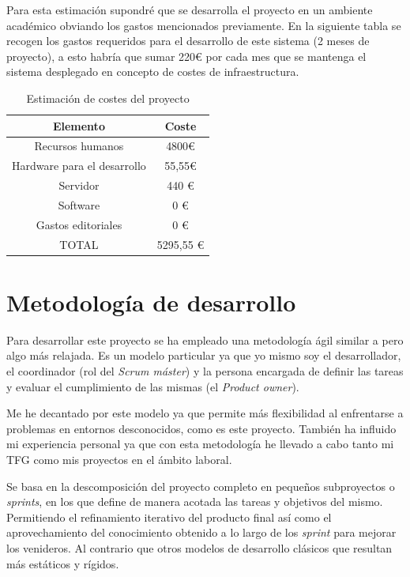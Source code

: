 Para esta estimación supondré que se desarrolla el proyecto en un ambiente académico obviando los gastos mencionados previamente. En la siguiente tabla se recogen los gastos requeridos para el desarrollo de este sistema (2 meses de proyecto), a esto habría que sumar 220€ por cada mes que se mantenga el sistema desplegado en concepto de costes de infraestructura.

\begin{table} [h!]
	\centering
	\begin{tabular}{| c | c |}
		\hline
		\textbf{Elemento}           & \textbf{Coste} \\ \hline
		Recursos humanos            & 4800€          \\
		Hardware para el desarrollo & 55,55€         \\
		Servidor                    & 440 €          \\
		Software                    & 0 €            \\
		Gastos editoriales          & 0 €            \\ \hline
		TOTAL                       & 5295,55 €      \\ \hline
	\end{tabular}
	\caption{Estimación de costes del proyecto}
\end{table}

\newpage

\section{Metodología de desarrollo}
\label{sc:metodologia}
Para desarrollar este proyecto se ha empleado una metodología ágil similar a \textit{}  pero algo más relajada. Es un modelo particular ya que yo mismo soy el desarrollador, el coordinador (rol del \textit{Scrum máster}) y la persona encargada de definir las tareas y evaluar el cumplimiento de las mismas (el \textit{Product owner}).

Me he decantado por este modelo ya que permite más flexibilidad al enfrentarse a problemas en entornos desconocidos, como es este proyecto. También ha influido mi experiencia personal ya que con esta metodología he llevado a cabo tanto mi \acrshort{TFG} como mis proyectos en el ámbito laboral. 

Se basa en la descomposición del proyecto completo en pequeños subproyectos o \textit{sprints}, en los que define de manera acotada las tareas y objetivos del mismo. Permitiendo el refinamiento iterativo del producto final así como el aprovechamiento del conocimiento obtenido a lo largo de los \textit{sprint} para mejorar los venideros. Al contrario que otros modelos de desarrollo clásicos que resultan más estáticos y rígidos.

